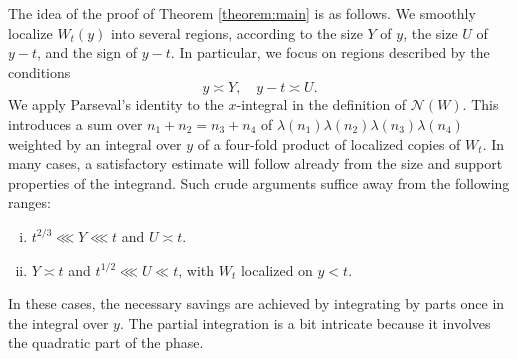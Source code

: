 \documentclass[reqno]{amsart} 
\begin{document}
The idea of the proof of Theorem \ref{theorem:main} is as follows.  We smoothly localize $W_t(y)$ into several regions, according to the size $Y$ of $y$, the size $U$ of $y - t$, and the sign of $y - t$.  In particular, we focus on regions described by the conditions
\begin{equation*}
  y \asymp Y, \quad y - t \asymp U.
\end{equation*}
We apply Parseval's identity to the $x$-integral in the definition of $\mathcal{N}(W)$.  This introduces a sum over $n_1 + n_2 = n_3 + n_4$ of $\lambda(n_1) \lambda (n _2 )  \lambda (n _3 ) \lambda (n _4 )$ weighted by an integral over $y$ of a four-fold product of localized copies of $W_t$.  In many cases, a satisfactory estimate will follow already from the size and support properties of the integrand.  Such crude arguments suffice away from the following ranges:
\begin{enumerate}[(i)]
\item $t ^{2/3}  \lll Y \lll t$ and $U \asymp t$.
\item $Y \asymp t$ and $t ^{1/2} \lll U \ll t$, with $W_t$ localized on $y < t$.
\end{enumerate} 
In these cases, the necessary savings are achieved by integrating by parts once in the integral over $y$.  The partial integration is a bit intricate because it involves the quadratic part of the phase.
\end{document}
